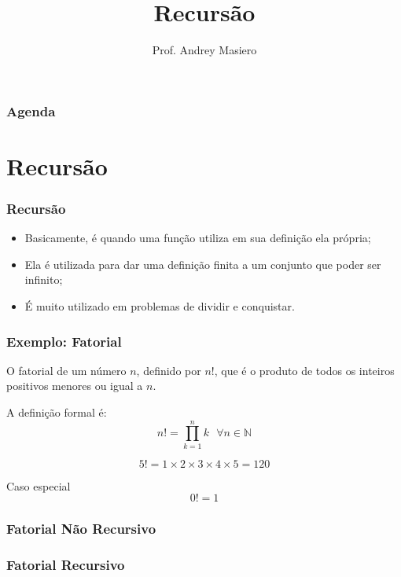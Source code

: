 \documentclass{beamer}
\begin{document}
\title[Recursão]{Recursão}
\author{Prof. Andrey Masiero}

\begin{frame}
  \titlepage
\end{frame}

\begin{frame}
  \frametitle{Agenda}
  \tableofcontents
\end{frame}

\section{Recursão}

\begin{frame}
	\frametitle{Recursão}
    \begin{itemize}[<+->]
        \item Basicamente, é quando uma função utiliza em sua definição ela própria;
        \item Ela é utilizada para dar uma definição finita a um conjunto que poder ser infinito;
        \item É muito utilizado em problemas de dividir e conquistar.
    \end{itemize}
\end{frame}

\begin{frame}
    \frametitle{Exemplo: Fatorial}
    O fatorial de um número $n$, definido por $n!$, que é o produto de todos os inteiros positivos menores ou igual a $n$.

    \begin{exampleblock}{A definição formal é:}
        \[
            n! = \prod_{k=1}^{n} k\ \ \ \forall n \in \mathbb{N}
        \]


        \[
            5! = 1 \times 2 \times 3 \times 4 \times 5 = 120
        \]
    \end{exampleblock}

    \begin{alertblock}{Caso especial}
        \[
            0! = 1
        \]
    \end{alertblock}
\end{frame}

\begin{frame}
	\frametitle{Fatorial Não Recursivo}
    \centering
    
\end{frame}

\begin{frame}
	\frametitle{Fatorial Recursivo}
    \centering
    
\end{frame}
\end{document}
